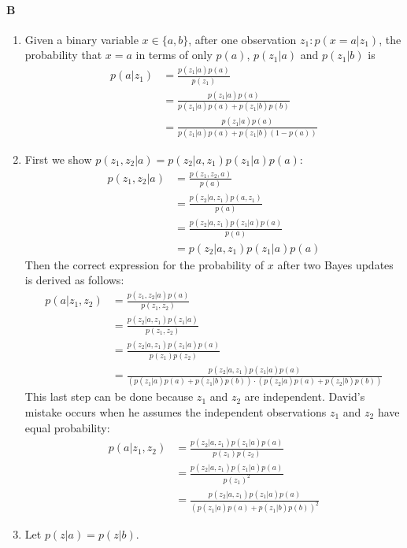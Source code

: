\documentclass[12pt]{article}
\begin{document}
\paragraph{B}
\begin{enumerate}
	\item  Given a binary variable $x\in\{a,b\}$, after one observation $z_1: p(x = a | z_1)$, the probability that $x=a$ in terms of only $p(a)$, $p(z_1| a)$ and $p(z_1 | b)$ is
	\begin{align*}
	p(a|z_1) &= \frac{p(z_1|a)p(a)}{p(z_1)} \\
						&= \frac{p(z_1|a)p(a)}{p(z_1|a)p(a) + p(z_1|b)p(b)} \\
						&= \frac{p(z_1|a)p(a)}{p(z_1|a)p(a) + p(z_1|b)(1-p(a))}
	\end{align*}
	\item  First we show $p(z_1,z_2|a) = p(z_2|a,z_1)p(z_1|a)p(a)$:
	\begin{align*}
	p(z_1,z_2|a) &= \frac{p(z_1,z_2,a)}{p(a)} \\
			     &= \frac{p(z_2|a,z_1)p(a,z_1)}{p(a)} \\
			     &= \frac{p(z_2|a,z_1)p(z_1|a)p(a)}{p(a)}\\
			     &=p(z_2|a,z_1)p(z_1|a)p(a)
	\end{align*}
	Then the correct expression for the probability of $x$ after two Bayes updates is derived as follows:
	\begin{align*}
	p(a|z_1,z_2) &= \frac{p(z_1,z_2|a)p(a)}{p(z_1,z_2)} \\
			     &= \frac{p(z_2|a,z_1)p(z_1|a)}{p(z_1,z_2)} \\
			     &= \frac{p(z_2|a,z_1)p(z_1|a)p(a)}{p(z_1)p(z_2)}\\
			     &= \frac{p(z_2|a,z_1)p(z_1|a)p(a)}{(p(z_1|a)p(a)+p(z_1|b)p(b))\cdot(p(z_2|a)p(a)+p(z_2|b)p(b))}
	\end{align*}
	This last step can be done because $z_1$ and $z_2$ are independent.  David's mistake occurs when he assumes the independent observations $z_1$ and $z_2$ have equal probability:
	\begin{align*}
	p(a|z_1,z_2) &= \frac{p(z_2|a,z_1)p(z_1|a)p(a)}{p(z_1)p(z_2)} \\
			     &= \frac{p(z_2|a,z_1)p(z_1|a)p(a)}{p(z_1)^2} \\
			     &= \frac{p(z_2|a,z_1)p(z_1|a)p(a)}{(p(z_1|a)p(a)+p(z_1|b)p(b))^2}
	\end{align*}
	\item  Let $p(z | a) = p(z | b)$.

\end{enumerate}
\end{document}
